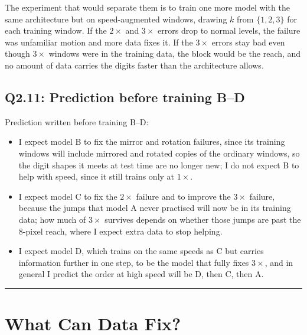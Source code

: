 \documentclass[11pt,letterpaper]{article}
\begin{document}
The experiment that would separate them is to train one more model with the same architecture but
on speed-augmented windows, drawing $k$ from $\{1, 2, 3\}$ for each training window. If the $2\times$ and $3\times$ errors drop to normal levels, the
failure was unfamiliar motion and more data fixes it. If the $3\times$ errors stay bad even though
$3\times$ windows were in the training data, the block would be the reach, and no amount of data carries
the digits faster than the architecture allows.

\subsection*{Q2.11: Prediction before training B--D}

Prediction written before training B--D:

\begin{itemize}
  \item I expect model B to fix the mirror and rotation failures, since its training windows will
        include mirrored and rotated copies of the ordinary windows, so the digit shapes it meets
        at test time are no longer new; I do not expect B to help with speed, since it still trains
        only at $1\times$.
  \item I expect model C to fix the $2\times$ failure and to improve the $3\times$ failure, because
        the jumps that model A never practised will now be in its training data; how much of
        $3\times$ survives depends on whether those jumps are past the 8-pixel reach, where I
        expect extra data to stop helping.
  \item I expect model D, which trains on the same speeds as C but carries information further in
        one step, to be the model that fully fixes $3\times$, and in general I predict the order at
        high speed will be D, then C, then A.
\end{itemize}

\vspace{10pt}
\hrule
\vspace{4pt}

\section*{What Can Data Fix?}
\end{document}

